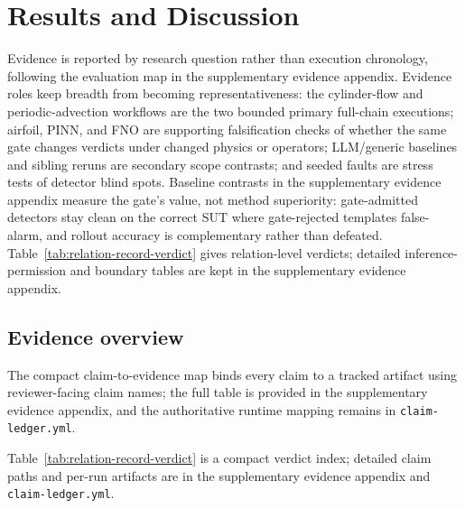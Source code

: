 \documentclass[preprint,12pt,authoryear]{elsarticle}
\begin{document}
\section{Results and Discussion}
\label{sec:results}

Evidence is reported by research question rather than execution chronology, following the evaluation map in the supplementary evidence appendix. Evidence roles keep breadth from becoming representativeness: the cylinder-flow and periodic-advection workflows are the two bounded primary full-chain executions; airfoil, PINN, and FNO are supporting falsification checks of whether the same gate changes verdicts under changed physics or operators; LLM/generic baselines and sibling reruns are secondary scope contrasts; and seeded faults are stress tests of detector blind spots. Baseline contrasts in the supplementary evidence appendix measure the gate's value, not method superiority: gate-admitted detectors stay clean on the correct SUT where gate-rejected templates false-alarm, and rollout accuracy is complementary rather than defeated. Table~\ref{tab:relation-record-verdict} gives relation-level verdicts; detailed inference-permission and boundary tables are kept in the supplementary evidence appendix.

\subsection{Evidence overview}
\label{subsec:claim-evidence-map}

The compact claim-to-evidence map binds every claim to a tracked artifact using reviewer-facing claim names; the full table is provided in the supplementary evidence appendix, and the authoritative runtime mapping remains in \texttt{claim-ledger.yml}.

\label{subsec:relation-record-verdict-map}

Table~\ref{tab:relation-record-verdict} is a compact verdict index; detailed claim paths and per-run artifacts are in the supplementary evidence appendix and \texttt{claim-ledger.yml}.
\end{document}
